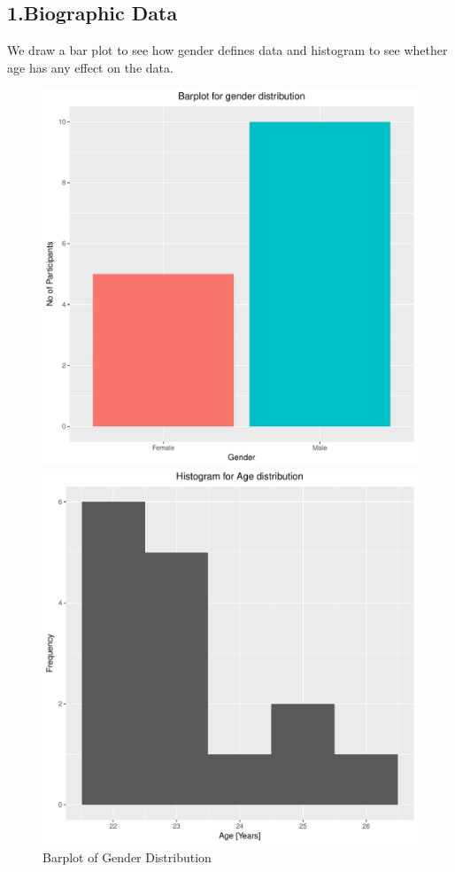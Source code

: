 \documentclass[12pt,epsf]{report}
\begin{document}
{\subsection*{1.Biographic Data}
We draw a bar plot to see how gender defines data and histogram to see whether age has any effect on the data.\\
\begin{figure}[!htb]
	\begin{minipage}[c]{0.5\linewidth}
	\includegraphics[width=\linewidth]{1_gender.pdf}
	\caption{Barplot of Gender Distribution}
	\end{minipage}
	\hfill
	\begin{minipage}[c]{0.5\linewidth}
	\includegraphics[width=\linewidth]{1_age.pdf}

\end{minipage}
\end{figure}}
\end{document}
